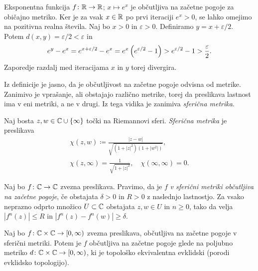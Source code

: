 \begin{primer}
    Eksponentna funkcija \(f \colon \mathbb R \to \mathbb R\); \(x \mapsto e^x\) je občutljiva na začetne pogoje za običajno metriko. Ker je za vsak \(x \in \mathbb R\) po prvi iteraciji \(e^x > 0\), se lahko omejimo na pozitivna realna števila. Naj bo \(x > 0\) in \(\varepsilon > 0\). Definiramo \(y = x + \varepsilon / 2\). Potem \(d (x, y) = \varepsilon / 2 < \varepsilon\) in
    \[e^{y} - e^{x} = e^{x + \varepsilon / 2} - e^x = e^x \left( e^{\varepsilon / 2} - 1 \right) > e^{\varepsilon / 2} - 1 > \frac{\varepsilon}{2}.\]
    Zaporedje razdalj med iteracijama \(x\) in \(y\) torej divergira.
\end{primer}

\noindent Iz definicije je jasno, da je občutljivost na začetne pogoje odvisna od metrike. Zanimivo je vprašanje, ali obstajajo različno metrike, torej da preslikava lastnost ima v eni metriki, a ne v drugi. Iz tega vidika je zanimiva \emph{sferična metrika}.

\begin{definicija}
    Naj bosta \(z, w \in \mathbb C \cup \{\infty\}\) točki na Riemannovi sferi. \emph{Sferična metrika} je preslikava
    \begin{align*}
        \chi (z, w) \coloneq \frac{|z - w|}{\sqrt{(1 + |z|^2) (1 + |w^2|)}},\\
        \chi (z, \infty) = \frac{1}{\sqrt{1 + |z|^2}}, \quad \chi (\infty, \infty) = 0.
    \end{align*}
\end{definicija}

\begin{definicija}
    Naj bo \(f \colon \mathbb C \to \mathbb C\) zvezna preslikava. Pravimo, da je \(f\) \emph{v sferični metriki občutljiva na začetne pogoje}, če obstajata \(\delta > 0\) in \(R > 0\) z naslednjo lastnostjo. Za vsako neprazno odprto množico \(U \subset \mathbb C\) obstajata \(z, w \in U\) in \(n \geq 0\), tako da velja \(|f^n (z)| \leq R\) in \(|f^n (z) - f^n (w)| \geq \delta\).
\end{definicija}

\begin{trditev}
    Naj bo \(f \colon \mathbb C \times \mathbb C \to [0, \infty)\) zvezna preslikava, občutljiva na začetne pogoje v sferični metriki. Potem je \(f\) občutljiva na začetne pogoje glede na poljubno metriko \(d \colon \mathbb C \times \mathbb C \to [0, \infty)\), ki je topološko ekvivalentna evklidski (porodi evklidsko topologijo).
\end{trditev}